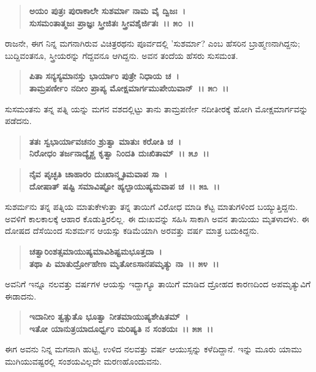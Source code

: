 \begin{verse}
\textbf{ಅಯಂ ಪುತ್ರಃ ಪುರಾಕಾಲೇ ಸುಶರ್ಮಾ ನಾಮ ವೈ ದ್ವಿಜಃ~।}\\\textbf{ಸುಸಮಂತಾತ್ಮಜಃ ಪ್ರಾಜ್ಞಃ ಸ್ತ್ರೀಜಿತಃ ಸ್ತ್ರೀವಶೈರ್ಜಿತಃ~।। ೫೦~।।}
\end{verse}

ರಾಜನೇ, ಈಗ ನಿನ್ನ ಮಗನಾಗಿರುವ ವಿಚಿತ್ರರಥನು ಪೂರ್ವದಲ್ಲಿ 'ಸುಶರ್ಮಾ? ಎಂಬ ಹೆಸರಿನ ಬ್ರಾಹ್ಮಣನಾಗಿದ್ದನು; ಬುದ್ದಿವಂತನೂ, ಸ್ತ್ರೀಯರನ್ನು ಗೆದ್ದವನೂ ಆಗಿದ್ದನು. ಅವನ ತಂದೆಯ ಹೆಸರು ಸುಸಮಂತ.

\begin{verse}
\textbf{ಪಿತಾ ಸನ್ಯಸ್ಯಮಾನಸ್ತು ಭಾರ್ಯಾಂ ಪುತ್ರೇ ನಿಧಾಯ ಚ~।}\\\textbf{ತಾಮ್ರಪರ್ಣೀಂ ನದೀಂ ಪ್ರಾಪ್ಯ ಮೋಕ್ಷಮಾರ್ಗಮುಪೇಯಿವಾನ್~।। ೫೧~।।}
\end{verse}

ಸುಸಮಂತನು ತನ್ನ ಪತ್ನಿ ಯನ್ನು ಮಗನ ವಶದಲ್ಲಿಟ್ಟು ತಾನು ತಾಮ್ರಪರ್ಣೀ ನದೀತೀರಕ್ಕೆ ಹೋಗಿ ಮೋಕ್ಷಮಾರ್ಗವನ್ನು ಪಡೆದನು.

\begin{verse}
\textbf{ತತಃ ಸ್ವಭಾರ್ಯಾವಚನಂ ಶ್ರುತ್ವಾ ಮಾತುಃ ಕರೋತಿ ಚ~।}\\\textbf{ನಿರೋಧಂ ತರ್ಜನಾದ್ಯೈಶ್ಚ ಕೃತ್ವಾ ನಿಂದತಿ ದುಃಖಿತಾಮ್~।। ೫೨~।। }
\end{verse}

\begin{verse}
\textbf{ನೈವ ಪೃಚ್ಛತಿ ಚಾಹಾರಂ ದುಃಖಾನ್ಮೃತಿಮವಾಪ ಸಾ~।}\\\textbf{ದೋಷಾತ್ ಷಷ್ಟಿ ಸಮಾವಿಷ್ಟೋ ಹ್ಯಲ್ಪಾಯುಷ್ಯಮವಾಪ ಚ~।। ೫೩~।।}
\end{verse}

ಸುಶರ್ಮನು ತನ್ನ ಪತ್ನಿಯ ಮಾತುಕೇಳುತ್ತಾ ತನ್ನ ತಾಯಿಗೆ ವಿರೋಧ ಮಾಡಿ ಕೆಟ್ಟ ಮಾತುಗಳಿಂದ ಬಯ್ಯುತ್ತಿದ್ದನು. ಅವಳಿಗೆ ಕಾಲಕಾಲಕ್ಕೆ ಆಹಾರ ಕೊಡುತ್ತಿರಲಿಲ್ಲ. ಈ ದುಃಖವನ್ನು ಸಹಿಸಿ ಸಾಕಾಗಿ ಅವನ ತಾಯಿಯು ಮೃತಳಾದಳು. ಈ ದೋಷದ ದೆಸೆಯಿಂದ ಸುಶರ್ಮನ ಆಯಸ್ಸು ಕಡಿಮೆಯಾಗಿ ಅರವತ್ತು ವರ್ಷ ಮಾತ್ರ ಬದುಕಿದ್ದನು.

\begin{verse}
\textbf{ಚತ್ವಾರಿಂಶತ್ಸಮಾಯುಷ್ಯಮಾವಿಶಿಷ್ಟಮಭೂತ್ತದಾ~।}\\\textbf{ತಥಾ ಪಿ ಮಾತುರ್ದ್ರೋಹೇಣ ಮೃತೋಽಸಾನಪಮೃತ್ಯು ನಾ~।। ೫೪~।।}
\end{verse}

ಅವನಿಗೆ ಇನ್ನೂ ನಲವತ್ತು ವರ್ಷಗಳ ಆಯಸ್ಸು ಇದ್ದಾಗ್ಯೂ ತಾಯಿಗೆ ಮಾಡಿದ ದ್ರೋಹದ ಕಾರಣದಿಂದ ಅಪಮೃತ್ಯುವಿಗೆ ಈಡಾದನು.

\begin{verse}
\textbf{ಇದಾನೀಂ ತ್ವತ್ಸುತೊ ಭೂತ್ವಾ ನೀತಮಾಯುಷ್ಯಶೇಷಿತಮ್~।}\\\textbf{ಇತೋ ಯಾನುತ್ರಯಾದೂರ್ಧ್ವಂ ಮರಿಷ್ಯತಿ ನ ಸಂಶಯಃ~।। ೫೫~।।}
\end{verse}

ಈಗ ಅವನು ನಿನ್ನ ಮಗನಾಗಿ ಹುಟ್ಟಿ, ಉಳಿದ ನಲವತ್ತು ವರ್ಷ ಆಯುಸ್ಸನ್ನು ಕಳೆದಿದ್ದಾನೆ. ಇನ್ನು ಮೂರು ಯಾಮು ಮುಗಿಯುವಷ್ಟರಲ್ಲಿ ಸಂಶಯವಿಲ್ಲದೇ ಮರಣಹೊಂದುವನು.

